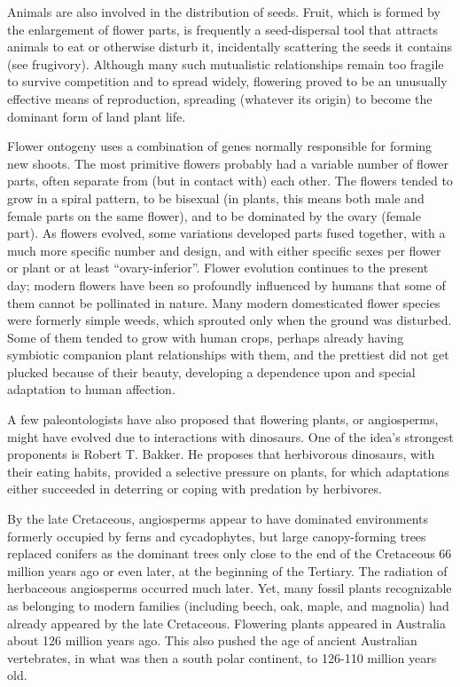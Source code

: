 Animals are also involved in the distribution of seeds. Fruit, which is formed by the enlargement of flower parts, is frequently a seed-dispersal tool that attracts animals to eat or otherwise disturb it, incidentally scattering the seeds it contains (see frugivory). Although many such mutualistic relationships remain too fragile to survive competition and to spread widely, flowering proved to be an unusually effective means of reproduction, spreading (whatever its origin) to become the dominant form of land plant life.

Flower ontogeny uses a combination of genes normally responsible for forming new shoots. The most primitive flowers probably had a variable number of flower parts, often separate from (but in contact with) each other. The flowers tended to grow in a spiral pattern, to be bisexual (in plants, this means both male and female parts on the same flower), and to be dominated by the ovary (female part). As flowers evolved, some variations developed parts fused together, with a much more specific number and design, and with either specific sexes per flower or plant or at least ``ovary-inferior''. Flower evolution continues to the present day; modern flowers have been so profoundly influenced by humans that some of them cannot be pollinated in nature. Many modern domesticated flower species were formerly simple weeds, which sprouted only when the ground was disturbed. Some of them tended to grow with human crops, perhaps already having symbiotic companion plant relationships with them, and the prettiest did not get plucked because of their beauty, developing a dependence upon and special adaptation to human affection.

A few paleontologists have also proposed that flowering plants, or angiosperms, might have evolved due to interactions with dinosaurs. One of the idea's strongest proponents is Robert T. Bakker. He proposes that herbivorous dinosaurs, with their eating habits, provided a selective pressure on plants, for which adaptations either succeeded in deterring or coping with predation by herbivores.

By the late Cretaceous, angiosperms appear to have dominated environments formerly occupied by ferns and cycadophytes, but large canopy-forming trees replaced conifers as the dominant trees only close to the end of the Cretaceous 66 million years ago or even later, at the beginning of the Tertiary. The radiation of herbaceous angiosperms occurred much later. Yet, many fossil plants recognizable as belonging to modern families (including beech, oak, maple, and magnolia) had already appeared by the late Cretaceous. Flowering plants appeared in Australia about 126 million years ago. This also pushed the age of ancient Australian vertebrates, in what was then a south polar continent, to 126-110 million years old.

